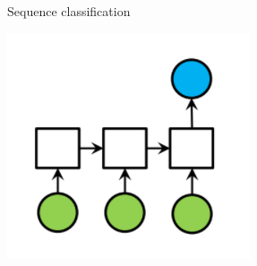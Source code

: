 \documentclass{beamer}
\begin{document}
\begin{frame}{Sequence classification}
	\begin{center}
		\includegraphics[scale=0.3]{./img/sc}
		

\end{center}
\end{frame}
\end{document}
